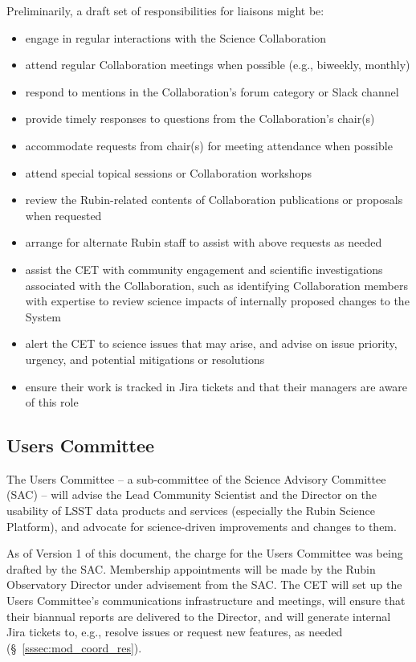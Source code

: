 \documentclass[DM,lsstdraft,toc]{lsstdoc}
\begin{document}
Preliminarily, a draft set of responsibilities for liaisons might be:
\begin{itemize}
\item engage in regular interactions with the Science Collaboration
\item attend regular Collaboration meetings when possible (e.g., biweekly, monthly)
\item respond to mentions in the Collaboration's forum category or Slack channel
\item provide timely responses to questions from the Collaboration's chair(s)
\item accommodate requests from chair(s) for meeting attendance when possible
\item attend special topical sessions or Collaboration workshops
\item review the Rubin-related contents of Collaboration publications or proposals when requested
\item arrange for alternate Rubin staff to assist with above requests as needed
\item assist the CET with community engagement and scientific investigations associated with the Collaboration, such as identifying Collaboration members with expertise to review science impacts of internally proposed changes to the System
\item alert the CET to science issues that may arise, and advise on issue priority, urgency, and potential mitigations or resolutions
\item ensure their work is tracked in Jira tickets and that their managers are aware of this role
\end{itemize}


\subsection{Users Committee}\label{ssec:mod_uc}

The Users Committee -- a sub-committee of the Science Advisory Committee (SAC) -- will advise the Lead Community Scientist and the Director on the usability of LSST data products and services (especially the Rubin Science Platform), and advocate for science-driven improvements and changes to them.

As of Version 1 of this document, the charge for the Users Committee was being drafted by the SAC.
Membership appointments will be made by the Rubin Observatory Director under advisement from the SAC.
The CET will set up the Users Committee's communications infrastructure and meetings, will ensure that their biannual reports are delivered to the Director, and will generate internal Jira tickets to, e.g., resolve issues or request new features, as needed (\S~\ref{sssec:mod_coord_res}). 
\end{document}
